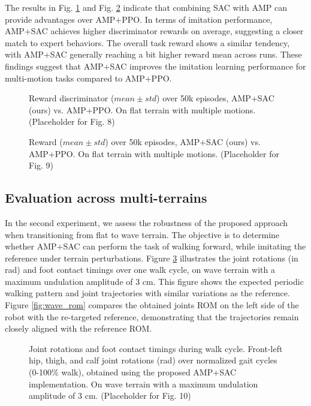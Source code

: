 \documentclass[letterpaper, 10pt, conference]{IEEEtran}
\begin{document}
The results in Fig. \ref{fig:reward_disc} and Fig. \ref{fig:reward_total} indicate that combining SAC with AMP can provide advantages over AMP+PPO. In terms of imitation performance, AMP+SAC achieves higher discriminator rewards on average, suggesting a closer match to expert behaviors. The overall task reward shows a similar tendency, with AMP+SAC generally reaching a bit higher reward mean across runs. These findings suggest that AMP+SAC improves the imitation learning performance for multi-motion tasks compared to AMP+PPO.

\begin{figure}[ht]
    \centering
    \caption{Reward discriminator ($mean \pm std$) over 50k episodes, AMP+SAC (ours) vs. AMP+PPO. On flat terrain with multiple motions. (Placeholder for Fig. 8)}
    \label{fig:reward_disc}
\end{figure}

\begin{figure}[ht]
    \centering
    \caption{Reward ($mean \pm std$) over 50k episodes, AMP+SAC (ours) vs. AMP+PPO. On flat terrain with multiple motions. (Placeholder for Fig. 9)}
    \label{fig:reward_total}
\end{figure}

\subsection{Evaluation across multi-terrains}
In the second experiment, we assess the robustness of the proposed approach when transitioning from flat to wave terrain. The objective is to determine whether AMP+SAC can perform the task of walking forward, while imitating the reference under terrain perturbations. Figure \ref{fig:wave_contacts} illustrates the joint rotations (in rad) and foot contact timings over one walk cycle, on wave terrain with a maximum undulation amplitude of 3 cm. This figure shows the expected periodic walking pattern and joint trajectories with similar variations as the reference. Figure \ref{fig:wave_rom} compares the obtained joints ROM on the left side of the robot with the re-targeted reference, demonstrating that the trajectories remain closely aligned with the reference ROM.

\begin{figure}[ht]
    \centering
    \caption{Joint rotations and foot contact timings during walk cycle. Front-left hip, thigh, and calf joint rotations (rad) over normalized gait cycles (0-100\% walk), obtained using the proposed AMP+SAC implementation. On wave terrain with a maximum undulation amplitude of 3 cm. (Placeholder for Fig. 10)}
    \label{fig:wave_contacts}
\end{figure}
\end{document}
